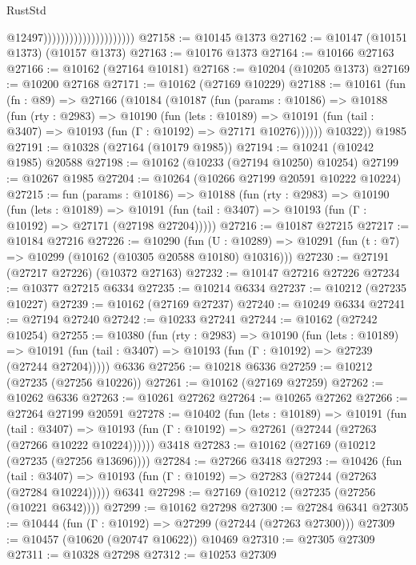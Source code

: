 \begin{lexlean}{RustStd}
\begin{coremodule}
                                              @12497)))))))))))))))))))))
@27158 := @10145 @1373
@27162 := @10147 (@10151 @1373) (@10157 @1373)
@27163 := @10176 @1373
@27164 := @10166 @27163
@27166 := @10162 (@27164 @10181)
@27168 := @10204 (@10205 @1373)
@27169 := @10200 @27168
@27171 := @10162 (@27169 @10229)
@27188 := @10161
    (fun (fn : @89) =>
    @27166
      (@10184
        (@10187
          (fun (params : @10186) =>
          @10188
            (fun (rty : @2983) =>
            @10190
              (fun (lets : @10189) =>
              @10191 (fun (tail : @3407) => @10193 (fun (Γ : @10192) => @27171 @10276))))))
        @10322))
    @1985
@27191 := @10328 (@27164 (@10179 @1985))
@27194 := @10241 (@10242 @1985) @20588
@27198 := @10162 (@10233 (@27194 @10250) @10254)
@27199 := @10267 @1985
@27204 := @10264 (@10266 @27199 @20591 @10222 @10224)
@27215 := fun (params : @10186) =>
  @10188
    (fun (rty : @2983) =>
    @10190
      (fun (lets : @10189) =>
      @10191 (fun (tail : @3407) => @10193 (fun (Γ : @10192) => @27171 (@27198 @27204)))))
@27216 := @10187 @27215
@27217 := @10184 @27216
@27226 := @10290
    (fun (U : @10289) => @10291 (fun (t : @7) => @10299 (@10162 (@10305 @20588 @10180) @10316)))
@27230 := @27191 (@27217 @27226) (@10372 @27163)
@27232 := @10147 @27216 @27226
@27234 := @10377 @27215 @6334
@27235 := @10214 @6334
@27237 := @10212 (@27235 @10227)
@27239 := @10162 (@27169 @27237)
@27240 := @10249 @6334
@27241 := @27194 @27240
@27242 := @10233 @27241
@27244 := @10162 (@27242 @10254)
@27255 := @10380
    (fun (rty : @2983) =>
    @10190
      (fun (lets : @10189) =>
      @10191 (fun (tail : @3407) => @10193 (fun (Γ : @10192) => @27239 (@27244 @27204)))))
    @6336
@27256 := @10218 @6336
@27259 := @10212 (@27235 (@27256 @10226))
@27261 := @10162 (@27169 @27259)
@27262 := @10262 @6336
@27263 := @10261 @27262
@27264 := @10265 @27262
@27266 := @27264 @27199 @20591
@27278 := @10402
    (fun (lets : @10189) =>
    @10191
      (fun (tail : @3407) =>
      @10193 (fun (Γ : @10192) => @27261 (@27244 (@27263 (@27266 @10222 @10224))))))
    @3418
@27283 := @10162 (@27169 (@10212 (@27235 (@27256 @13696))))
@27284 := @27266 @3418
@27293 := @10426
    (fun (tail : @3407) => @10193 (fun (Γ : @10192) => @27283 (@27244 (@27263 (@27284 @10224)))))
    @6341
@27298 := @27169 (@10212 (@27235 (@27256 (@10221 @6342))))
@27299 := @10162 @27298
@27300 := @27284 @6341
@27305 := @10444 (fun (Γ : @10192) => @27299 (@27244 (@27263 @27300)))
@27309 := @10457 (@10620 (@20747 @10622)) @10469
@27310 := @27305 @27309
@27311 := @10328 @27298
@27312 := @10253 @27309

\end{coremodule}
\end{lexlean}
